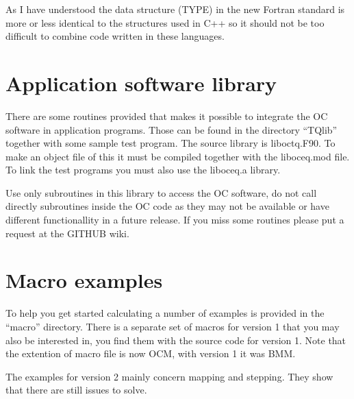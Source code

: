 \documentclass[12pt]{article}
\begin{document}
As I have understood the data structure (TYPE) in the new Fortran
standard is more or less identical to the structures used in C++ so it
should not be too difficult to combine code written in these
languages.

\section{Application software library}

There are some routines provided that makes it possible to integrate
the OC software in application programs.  Those can be found in the
directory ``TQlib'' together with some sample test program.  The
source library is liboctq.F90.  To make an object file of this it must
be compiled together with the liboceq.mod file.  To link the test
programs you must also use the liboceq.a library.

Use only subroutines in this library to access the OC software, do not
call directly subroutines inside the OC code as they may not be
available or have different functionallity in a future release.  If
you miss some routines please put a request at the GITHUB wiki.

\section{Macro examples}

To help you get started calculating a number of examples is provided
in the ``macro'' directory.  There is a separate set of macros for
version 1 that you may also be interested in, you find them with the
source code for version 1.  Note that the extention of macro file is
now OCM, with version 1 it was BMM.

The examples for version 2 mainly concern mapping and stepping.  They
show that there are still issues to solve.
\end{document}
